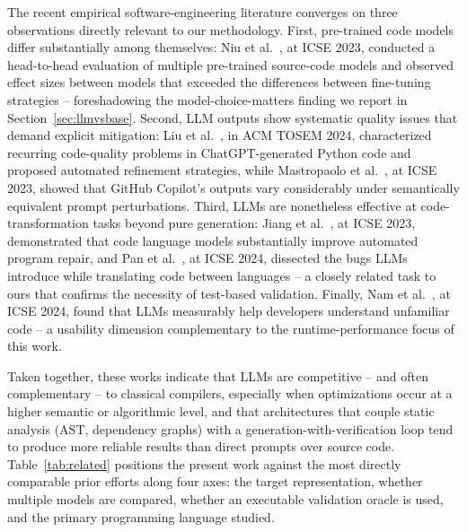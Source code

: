 \documentclass[conference]{IEEEtran}
\begin{document}
The recent empirical software-engineering literature converges on three observations directly relevant to our methodology. First, pre-trained code models differ substantially among themselves: Niu et al.~\cite{DBLP:conf/icse/NiuLNCGL23}, at ICSE 2023, conducted a head-to-head evaluation of multiple pre-trained source-code models and observed effect sizes between models that exceeded the differences between fine-tuning strategies -- foreshadowing the model-choice-matters finding we report in Section~\ref{sec:llmvsbase}. Second, LLM outputs show systematic quality issues that demand explicit mitigation: Liu et al.~\cite{DBLP:journals/tosem/LiuLWTLLL24}, in ACM TOSEM 2024, characterized recurring code-quality problems in ChatGPT-generated Python code and proposed automated refinement strategies, while Mastropaolo et al.~\cite{DBLP:conf/icse/MastropaoloPGCSO23}, at ICSE 2023, showed that GitHub Copilot's outputs vary considerably under semantically equivalent prompt perturbations. Third, LLMs are nonetheless effective at code-transformation tasks beyond pure generation: Jiang et al.~\cite{DBLP:conf/icse/JiangLLT23}, at ICSE 2023, demonstrated that code language models substantially improve automated program repair, and Pan et al.~\cite{DBLP:conf/icse/PanIKSWMSPSJ24}, at ICSE 2024, dissected the bugs LLMs introduce while translating code between languages -- a closely related task to ours that confirms the necessity of test-based validation. Finally, Nam et al.~\cite{DBLP:conf/icse/NamMHVM24}, at ICSE 2024, found that LLMs measurably help developers understand unfamiliar code -- a usability dimension complementary to the runtime-performance focus of this work.

Taken together, these works indicate that LLMs are competitive -- and often complementary -- to classical compilers, especially when optimizations occur at a higher semantic or algorithmic level, and that architectures that couple static analysis (AST, dependency graphs) with a generation-with-verification loop tend to produce more reliable results than direct prompts over source code. Table~\ref{tab:related} positions the present work against the most directly comparable prior efforts along four axes: the target representation, whether multiple models are compared, whether an executable validation oracle is used, and the primary programming language studied.
\end{document}
